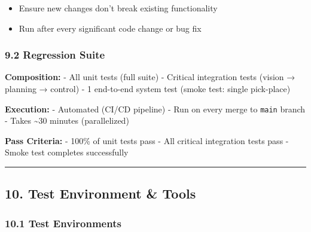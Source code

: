 \documentclass[
]{article}
\providecommand{\tightlist}{%
  \setlength{\itemsep}{0pt}\setlength{\parskip}{0pt}}
\begin{document}
\begin{itemize}
\tightlist
\item
  Ensure new changes don't break existing functionality
\item
  Run after every significant code change or bug fix
\end{itemize}

\hypertarget{regression-suite}{%
\subsubsection{9.2 Regression Suite}\label{regression-suite}}

\textbf{Composition:} - All unit tests (full suite) - Critical
integration tests (vision → planning → control) - 1 end-to-end system
test (smoke test: single pick-place)

\textbf{Execution:} - Automated (CI/CD pipeline) - Run on every merge to
\texttt{main} branch - Takes \textasciitilde30 minutes (parallelized)

\textbf{Pass Criteria:} - 100\% of unit tests pass - All critical
integration tests pass - Smoke test completes successfully

\begin{center}\rule{0.5\linewidth}{0.5pt}\end{center}

\hypertarget{test-environment-tools}{%
\subsection{10. Test Environment \&
Tools}\label{test-environment-tools}}

\hypertarget{test-environments}{%
\subsubsection{10.1 Test Environments}\label{test-environments}}
\end{document}
